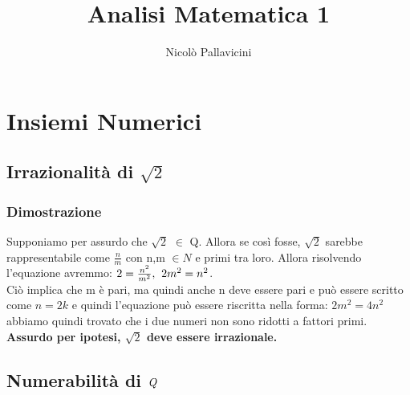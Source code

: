 \documentclass[11pt, a4paper]{article}
\author{Nicolò Pallavicini}
\title{Analisi Matematica 1}
\begin{document}
\maketitle
\newpage

\section{Insiemi Numerici}
\subsection{Irrazionalità di $\sqrt{2}$}
\subsubsection*{Dimostrazione}
Supponiamo per assurdo che $\sqrt{2}$ $\in$ Q. Allora se così fosse, $\sqrt{2}$ sarebbe rappresentabile come $\frac{n}{m}$ con n,m $\in{N}$ e primi tra loro. Allora risolvendo l'equazione avremmo: \begin{math}
2=\frac{n^2}{m^2},$\hspace{0.2cm}$2m^2=n^2
\end{math}.
\\
Ciò implica che m è pari, ma quindi anche n deve essere pari e può essere scritto come \begin{math} n=2k \end{math}
e quindi l'equazione può essere riscritta nella forma: \begin{math} 2m^2=4n^2 \end{math} abbiamo quindi trovato che i due numeri non sono ridotti a fattori primi. \textbf{Assurdo per ipotesi, $\sqrt{2}$ deve essere irrazionale.}

\subsection{Numerabilità di $\emph{Q}$}
\end{document}
